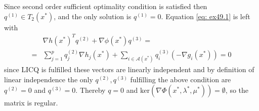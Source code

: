 Since second order sufficient optimality condition is satisfied then $q^{(1)}
\in T_2(x^{*})$, and the only solution is $q^{(1)} = 0$. Equation \ref{eq:
ex49.1} is left with
\begin{align}
    &\nabla h(x^{*})^{T}q^{(2)}+\nabla \phi(x^{*})q^{(3)} =\\
    =& \sum_{j=1}^{p} q_j^{(2)}\nabla h_j(x^{*}) + \sum_{i \in
    \mathcal{A}(x^{*})} q_i^{(3)}(-\nabla g_i(x^{*})) = 0
\end{align}
since LICQ is fulfilled these vectors are linearly independent and by
definition of linear independence the only $q^{(2)}, q^{(3)}$ fulfilling the
above condition are $q^{(2)} = 0$ and $q^{(3)} = 0$. Thereby $q = 0$ and
$\text{ker}(\nabla\Phi(x^{*},\lambda^{*},\mu^{*})) = \emptyset$, so the matrix
is regular.




























